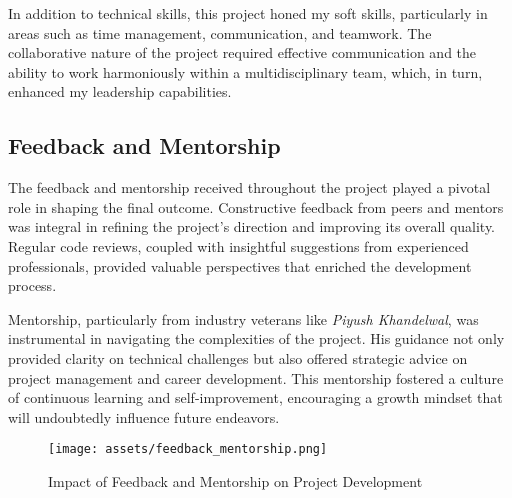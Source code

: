 In addition to technical skills, this project honed my soft skills, particularly in areas such as time management, communication, and teamwork. The collaborative nature of the project required effective communication and the ability to work harmoniously within a multidisciplinary team, which, in turn, enhanced my leadership capabilities.

\subsection{Feedback and Mentorship}
The feedback and mentorship received throughout the project played a pivotal role in shaping the final outcome. Constructive feedback from peers and mentors was integral in refining the project’s direction and improving its overall quality. Regular code reviews, coupled with insightful suggestions from experienced professionals, provided valuable perspectives that enriched the development process.

Mentorship, particularly from industry veterans like \textit{Piyush Khandelwal}, was instrumental in navigating the complexities of the project. His guidance not only provided clarity on technical challenges but also offered strategic advice on project management and career development. This mentorship fostered a culture of continuous learning and self-improvement, encouraging a growth mindset that will undoubtedly influence future endeavors.

\begin{figure}[h]
    \centering
    \texttt{[image: assets/feedback\_mentorship.png]}
    \caption{Impact of Feedback and Mentorship on Project Development}
    \label{fig:feedback_mentorship}
\end{figure}

